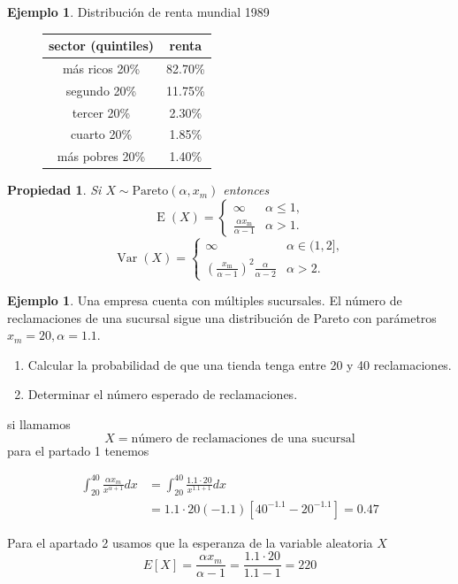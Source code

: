 \documentclass[]{book}
\theoremstyle{plain}
\newtheorem{property}[theorem]{Propiedad}
\theoremstyle{definition}
\newtheorem{example}[theorem]{Ejemplo}
\theoremstyle{definition} %
\begin{document}
\begin{example}
 

Distribución de renta mundial 1989

\begin{figure}[htbp]
  \centering
    \begin{tabular}{cc}
       sector (quintiles)& renta \\
       \hline
       más ricos 20\% 	&82.70\% \\ 
        segundo  20\% 	&11.75\% \\ 
        tercer 20\%   	&2.30\% \\
        cuarto 20\% 	&1.85\% \\
        más pobres 20\% 	&1.40\%  \\
      \end{tabular}
\end{figure}

\end{example}

\begin{property}
Si $X\sim \text{Pareto}(\alpha, x_m)$ entonces 
\[\operatorname {E} (X)={\begin{cases}\infty &\alpha \leq 1,\\{\frac {\alpha x_{\mathrm {m} }}{\alpha -1}}&\alpha >1.\end{cases}}\]
\[
  \operatorname {Var} (X)={\begin{cases}\infty &\alpha \in (1,2],\\\left({\frac {x_{\mathrm {m} }}{\alpha -1}}\right)^{2}{\frac {\alpha }{\alpha -2}}&\alpha >2.\end{cases}}  
\]

\end{property}




\begin{example}
  Una empresa cuenta con múltiples sucursales. El número de reclamaciones de una sucursal sigue una distribución de Pareto 
  con parámetros $x_m = 20, \alpha = 1.1$. 
  \begin{enumerate}
    \item Calcular la probabilidad de que una tienda tenga entre 20 y 40 reclamaciones.
    \item Determinar el número esperado de reclamaciones.
  \end{enumerate}

  si llamamos 
  \[X=\text{número de reclamaciones de una sucursal}\] 
  para el partado 1 tenemos 

  \begin{align*}
    \int^{40}_{20} \frac{\alpha x_m}{x^{\alpha+1}}dx &=\int^{40}_{20} \frac{1.1\cdot 20}{x^{1.1 +1}}dx\\
    &= 1.1\cdot 20 (-1.1)[40^{-1.1} - 20^{-1.1}] = 0.47
  \end{align*}

  Para el apartado 2 usamos que la esperanza de la variable aleatoria $X$ 
  \[E[X] = \frac {\alpha x_m}{\alpha -1} = \frac{1.1 \cdot 20}{1.1 -1} = 220\]

\end{example}
\end{document}
